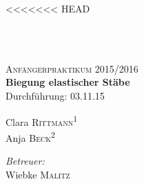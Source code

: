 <<<<<<< HEAD
\begin{titlepage}
\ \\
[1cm]
	\par
	\hfill
	\par
\begin{center}
\ \\
[5cm]	
	\textsc{\Huge Anfängerpraktikum 2015/2016} \\
[2cm]
	\textbf{\Huge Biegung elastischer Stäbe} \\
[1cm]
	{\large Durchführung: 03.11.15} \\
[4cm]
\begin{minipage}{0.4\textwidth}
	\begin{flushleft} \large
		Clara \textsc{Rittmann}\textsuperscript{1} \\
		Anja \textsc{Beck}\textsuperscript{2}
	\end{flushleft}
\end{minipage}
\hfill
\begin{minipage}{0.4\textwidth}
	\begin{flushright} \large
		\emph{Betreuer:} \\
		Wiebke \textsc{Malitz}
	\end{flushright}
\end{minipage}
\end{center}
\end{titlepage}
